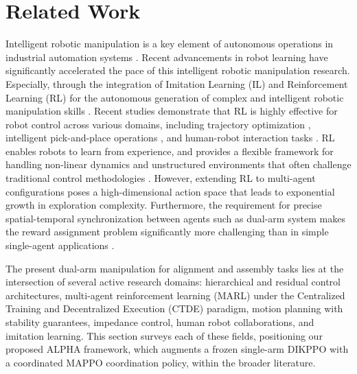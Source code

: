 \documentclass[lettersize,journal]{IEEEtran}
\begin{document}
\section{Related Work}
\label{related_work}
Intelligent robotic manipulation is a key element of autonomous operations in industrial automation systems \cite{surya2025iapf}. Recent advancements in robot learning have significantly accelerated the pace of this intelligent robotic manipulation research. Especially, through the integration of Imitation Learning (IL) and Reinforcement Learning (RL) for the autonomous generation of complex and intelligent robotic manipulation skills \cite{related-28, related-29}. Recent studies demonstrate that RL is highly effective for robot control across various domains, including trajectory optimization \cite{related-30}, intelligent pick-and-place operations \cite{related-32}, and human-robot interaction tasks \cite{related-33, related-34}. RL enables robots to learn from experience, and provides a flexible framework for handling non-linear dynamics and unstructured environments that often challenge traditional control methodologies \cite{related-35}. However, extending RL to multi-agent configurations poses a high-dimensional action space that leads to exponential growth in exploration complexity. Furthermore, the requirement for precise spatial-temporal synchronization between agents such as dual-arm system makes the reward assignment problem significantly more challenging than in simple single-agent applications \cite{related-36}.     

The present dual-arm manipulation for alignment and assembly tasks lies at the intersection of several active research domains: hierarchical and residual control architectures, multi-agent reinforcement learning (MARL) under the Centralized Training and Decentralized Execution (CTDE) paradigm, motion planning with stability guarantees, impedance control, human robot collaborations, and imitation learning. This section surveys each of these fields, positioning our proposed ALPHA framework, which augments a frozen single-arm DIKPPO with a coordinated MAPPO coordination policy, within the broader literature.
\end{document}
